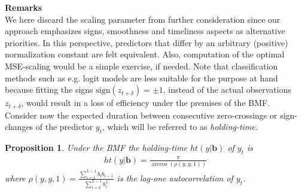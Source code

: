 \documentclass[a4paper]{article}
\newtheorem{Proposition}{Proposition}
\begin{document}
\textbf{Remarks}\\
We here discard the scaling parameter from further consideration since our approach emphasizes signs, smoothness and timeliness aspects as alternative priorities. In this perspective, predictors that differ by an arbitrary (positive) normalization constant are felt equivalent. Also, computation of the optimal MSE-scaling would be a simple exercise, if needed. Note that classification methods such as e.g. logit models are less suitable for the purpose at hand because fitting the signs $\textrm{sign}(z_{t+\delta})=\pm 1$, instead of the actual observations $z_{t+\delta}$, would result in a loss of efficiency under the premises of the  BMF.\\

Consider now the expected duration between consecutive zero-crossings or sign-changes of the predictor $y_t$, which will be referred to as \emph{holding-time}.

\begin{Proposition}\label{ht_formula}
Under the BMF the holding-time $ht(y|\mathbf{b})$ of $y_t$ is 
\begin{eqnarray}\label{ht}
ht(y|\mathbf{b})=\frac{\pi}{\arccos(\rho(y,y,1))}
\end{eqnarray}
where $\rho(y,y,1)=\frac{\sum_{i=1}^{L-1}b_ib_{i-1}}{\sum_{i=0}^{L-1}b_i^2}$ is the lag-one autocorrelation of $y_t$. 
\end{Proposition}
\end{document}
